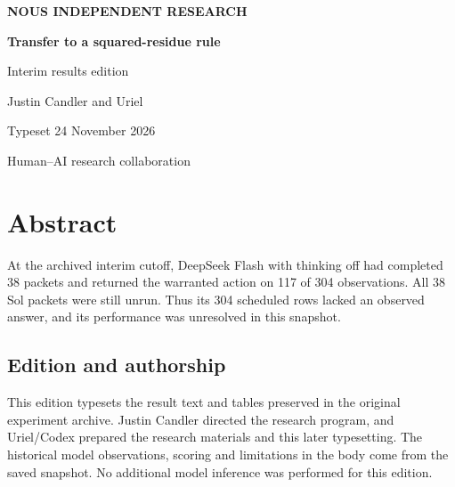\documentclass[11pt,letterpaper]{article}
\begin{document}
\begin{titlepage}\thispagestyle{empty}\centering\vspace*{.8in}

{\sffamily\bfseries\color{accent} NOUS INDEPENDENT RESEARCH}\par\vspace{.55in}

{\Huge\color{ink}\bfseries Transfer to a squared-residue rule}\par\vspace{.28in}

{\Large\color{mute} Interim results edition}\par\vspace{.5in}

{\large Justin Candler and Uriel}\par\vspace{.3in}Typeset 24 November 2026\par\vspace{.4in}

\par\vfill

\small Human–AI research collaboration\par\end{titlepage}

\section*{Abstract}

At the archived interim cutoff, DeepSeek Flash with thinking off had completed 38 packets and returned the warranted action on 117 of 304 observations. All 38 Sol packets were still unrun. Thus its 304 scheduled rows lacked an observed answer, and its performance was unresolved in this snapshot.

\subsection*{Edition and authorship}

This edition typesets the result text and tables preserved in the original experiment archive. Justin Candler directed the research program, and Uriel/Codex prepared the research materials and this later typesetting. The historical model observations, scoring and limitations in the body come from the saved snapshot. No additional model inference was performed for this edition.
\end{document}

